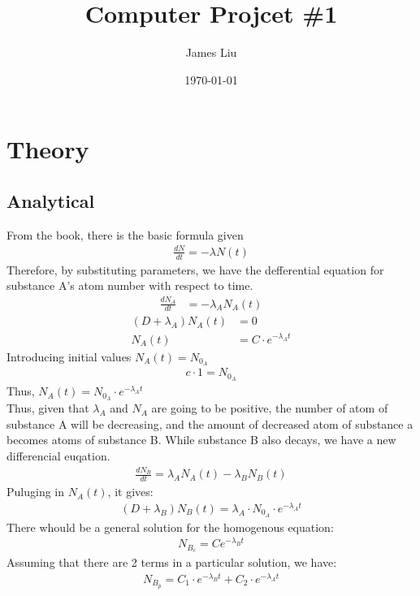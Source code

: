 \documentclass{article}
\title{\textbf{Computer Projcet \#1 }}
\author{James Liu}
\date{\today }
\begin{document}
{}
\section{Theory}
\subsection{Analytical}
From the book, there is the basic formula given
\begin{align}
    \frac{dN}{dt} = -\lambda N(t) \label{base}
\end{align}
Therefore, by substituting parameters, we have the defferential equation for substance A's atom number with respect to time.
\begin{align}
    \frac{dN_A}{dt} &= -\lambda_AN_A(t)\label{NAtd}
\end{align}
\begin{align*}
    (D+\lambda_A)N_A(t)&=0\\
    N_A(t)&=C\cdot e^{-\lambda_A t}
\end{align*}
Introducing initial values \(N_A(t)=N_{0_A}\)
\begin{align*}
    c\cdot 1 = N_{0_A}
\end{align*}
Thus, \(N_A(t)=N_{0_A}\cdot e^{-\lambda_A t}\)\\
Thus, given that \(\lambda_A\) and \(N_A\) are going to be positive,
the number of atom of substance A will be decreasing, and the amount of decreased 
atom of substance a becomes atoms of substance B. While substance B also decays, we have a new differencial euqation.
\begin{align}
    \frac{dN_B}{dt} = \lambda_AN_A(t)-\lambda_BN_B(t)\label{NBtd}
\end{align}
Puluging in \(N_A(t)\), it gives:
\begin{align*}
    (D+\lambda_B)N_B(t)=\lambda_A \cdot N_{0_A}\cdot e^{-\lambda_A t}
\end{align*}
There whould be a general solution for the homogenous equation:
\begin{align*}
    N_{B_c} = C e^{-\lambda _B t}
\end{align*}
Assuming that there are 2 terms in a particular solution, we have:
\begin{align*}
    N_{B_p}=C_1\cdot e^{-\lambda _B t}+C_2\cdot e^{-\lambda _A t}
\end{align*}
\end{document}
